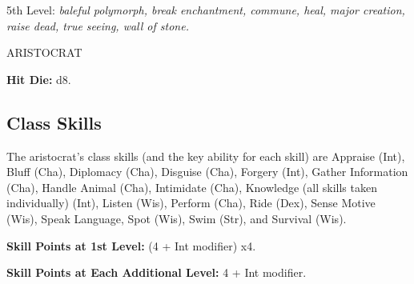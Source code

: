 \documentclass{article}
\begin{document}
5th Level: \textit{baleful polymorph, break enchantment, commune, heal, major creation, 
raise dead, true seeing, wall of stone.}

\vspace{12pt}
ARISTOCRAT

\textbf{Hit Die:} d8.

\subsection*{\textbf{Class Skills}}

The aristocrat's class skills (and the key ability for each skill) are Appraise 
(Int), Bluff (Cha), Diplomacy (Cha), Disguise (Cha), Forgery (Int), Gather Information 
(Cha), Handle Animal (Cha), Intimidate (Cha), Knowledge (all skills taken individually) 
(Int), Listen (Wis), Perform (Cha), Ride (Dex), Sense Motive (Wis), Speak Language, 
Spot (Wis), Swim (Str), and Survival (Wis). 

\textbf{Skill Points at 1st Level:} (4 + Int modifier) x4.

\textbf{Skill Points at Each Additional Level:} 4 + Int modifier.

\vspace{12pt}
\end{document}
